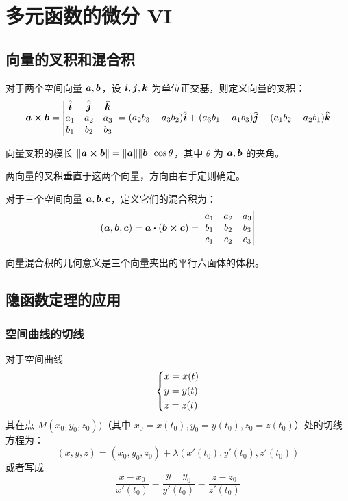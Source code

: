 \section{多元函数的微分 VI}

\subsection{向量的叉积和混合积}

\begin{definition}[叉积]
    对于两个空间向量 $\boldsymbol{a}, \boldsymbol{b}$，设 $\boldsymbol{i}, \boldsymbol{j}, \boldsymbol{k}$ 为单位正交基，则定义向量的叉积：
    $$
    \vect{a} \cp \vect{b} = \begin{vmatrix}
        \vu*{i} & \vu*{j} & \vu*{k} \\
        a_1 & a_2 & a_3 \\
        b_1 & b_2 & b_3
    \end{vmatrix} = (a_2 b_3 - a_3 b_2) \vu*{i} + (a_3 b_1 - a_1 b_3) \vu*{j} + (a_1 b_2 - a_2 b_1) \vu*{k}
    $$
\end{definition}

向量叉积的模长 $\norm{\vect{a} \cp \vect{b}} = \norm{\vect{a}} \norm{\vect{b}} \cos \theta$，其中 $\theta$ 为 $\boldsymbol{a}, \boldsymbol{b}$ 的夹角。

两向量的叉积垂直于这两个向量，方向由右手定则确定。

\begin{definition}[向量的混合积]
    对于三个空间向量 $\boldsymbol{a}, \boldsymbol{b}, \boldsymbol{c}$，定义它们的混合积为：
    $$
    (\vect{a}, \vect{b}, \vect{c}) = \vect{a} \vdot (\vect{b} \cp \vect{c}) = \begin{vmatrix}
        a_1 & a_2 & a_3 \\
        b_1 & b_2 & b_3 \\
        c_1 & c_2 & c_3
    \end{vmatrix}
    $$
\end{definition}

向量混合积的几何意义是三个向量夹出的平行六面体的体积。

\subsection{隐函数定理的应用}

\subsubsection{空间曲线的切线}

对于空间曲线
$$
\begin{dcases}
    x = x(t) \\
    y = y(t) \\
    z = z(t)
\end{dcases}
$$
其在点 $M(x_0, y_0, z_0))$（其中 $x_0 = x(t_0), y_0 = y(t_0), z_0 = z(t_0)$）处的切线方程为：
$$
(x, y, z) = (x_0, y_0, z_0) + \lambda (x'(t_0), y'(t_0), z'(t_0))
$$
或者写成
$$
\frac{x - x_0}{x'(t_0)} = \frac{y - y_0}{y'(t_0)} = \frac{z - z_0}{z'(t_0)}
$$

